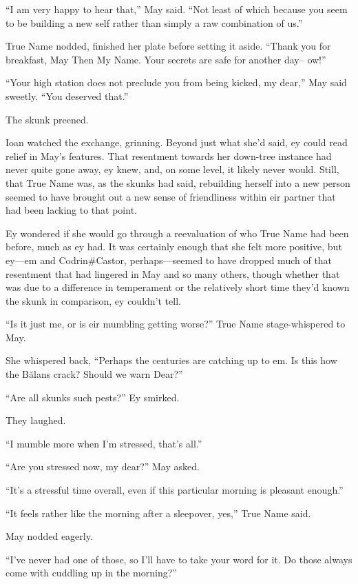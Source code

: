 ``I am very happy to hear that,'' May said. ``Not least of which because you seem to be building a new self rather than simply a raw combination of us.''

True Name nodded, finished her plate before setting it aside. ``Thank you for breakfast, May Then My Name. Your secrets are safe for another day-- ow!''

``Your high station does not preclude you from being kicked, my dear,'' May said sweetly. ``You deserved that.''

The skunk preened.

Ioan watched the exchange, grinning. Beyond just what she'd said, ey could read relief in May's features. That resentment towards her down-tree instance had never quite gone away, ey knew, and, on some level, it likely never would. Still, that True Name was, as the skunks had said, rebuilding herself into a new person seemed to have brought out a new sense of friendliness within eir partner that had been lacking to that point.

Ey wondered if she would go through a reevaluation of who True Name had been before, much as ey had. It was certainly enough that she felt more positive, but ey—em and Codrin\#Castor, perhaps—seemed to have dropped much of that resentment that had lingered in May and so many others, though whether that was due to a difference in temperament or the relatively short time they'd known the skunk in comparison, ey couldn't tell.

``Is it just me, or is eir mumbling getting worse?'' True Name stage-whispered to May.

She whispered back, ``Perhaps the centuries are catching up to em. Is this how the Bălans crack? Should we warn Dear?''

``Are all skunks such pests?'' Ey smirked.

They laughed.

``I mumble more when I'm stressed, that's all.''

``Are you stressed now, my dear?'' May asked.

``It's a stressful time overall, even if this particular morning is pleasant enough.''

``It feels rather like the morning after a sleepover, yes,'' True Name said.

May nodded eagerly.

``I've never had one of those, so I'll have to take your word for it. Do those always come with cuddling up in the morning?''

